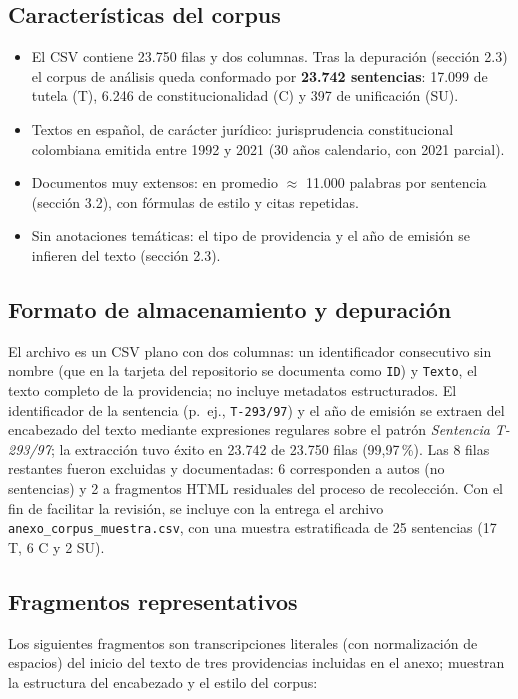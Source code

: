 \documentclass[11pt]{tg_usta}
\begin{document}
\subsection{Características del corpus}
\begin{itemize}
  \item El CSV contiene 23.750 filas y dos columnas. Tras la depuración (sección 2.3) el corpus de análisis queda conformado por \textbf{23.742 sentencias}: 17.099 de tutela (T), 6.246 de constitucionalidad (C) y 397 de unificación (SU).
  \item Textos en español, de carácter jurídico: jurisprudencia constitucional colombiana emitida entre 1992 y 2021 (30 años calendario, con 2021 parcial).
  \item Documentos muy extensos: en promedio $\approx$ 11.000 palabras por sentencia (sección 3.2), con fórmulas de estilo y citas repetidas.
  \item Sin anotaciones temáticas: el tipo de providencia y el año de emisión se infieren del texto (sección 2.3).
\end{itemize}

\subsection{Formato de almacenamiento y depuración}
El archivo es un CSV plano con dos columnas: un identificador consecutivo sin nombre (que en la tarjeta del repositorio se documenta como \texttt{ID}) y \texttt{Texto}, el texto completo de la providencia; no incluye metadatos estructurados. El identificador de la sentencia (p.~ej., \texttt{T-293/97}) y el año de emisión se extraen del encabezado del texto mediante expresiones regulares sobre el patrón \emph{Sentencia T-293/97}; la extracción tuvo éxito en 23.742 de 23.750 filas (99,97\,\%). Las 8 filas restantes fueron excluidas y documentadas: 6 corresponden a autos (no sentencias) y 2 a fragmentos HTML residuales del proceso de recolección. Con el fin de facilitar la revisión, se incluye con la entrega el archivo \texttt{anexo\_corpus\_muestra.csv}, con una muestra estratificada de 25 sentencias (17 T, 6 C y 2 SU).

\subsection{Fragmentos representativos}
Los siguientes fragmentos son transcripciones literales (con normalización de espacios) del inicio del texto de tres providencias incluidas en el anexo; muestran la estructura del encabezado y el estilo del corpus:
\end{document}
